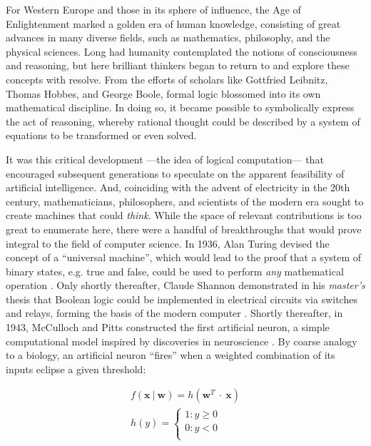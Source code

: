 For Western Europe and those in its sphere of influence, the Age of Enlightenment marked a golden era of human knowledge, consisting of great advances in many diverse fields, such as mathematics, philosophy, and the physical sciences.
Long had humanity contemplated the notions of consciousness and reasoning, but here brilliant thinkers began to return to and explore these concepts with resolve.
From the efforts of scholars like Gottfried Leibnitz, Thomas Hobbes, and George Boole, formal logic blossomed into its own mathematical discipline.
In doing so, it became possible to symbolically express the act of reasoning, whereby rational thought could be described by a system of equations to be transformed or even solved.

It was this critical development ---the idea of logical computation--- that encouraged subsequent generations to speculate on the apparent feasibility of artificial intelligence.
And, coinciding with the advent of electricity in the 20th century, mathematicians, philosophers, and scientists of the modern era sought to create machines that could \emph{think}.
While the space of relevant contributions is too great to enumerate here, there were a handful of breakthroughs that would prove integral to the field of computer science.
In 1936, Alan Turing devised the concept of a ``universal machine'', which would lead to the proof that a system of binary states, e.g. true and false, could be used to perform \emph{any} mathematical operation \cite{Turing1936Computable}.
Only shortly thereafter, Claude Shannon demonstrated in his \emph{master's} thesis that Boolean logic could be implemented in electrical circuits via switches and relays, forming the basis of the modern computer \cite{Shannon1938Symbolic}.
Shortly thereafter, in 1943, McCulloch and Pitts constructed the first artificial neuron, a simple computational model inspired by discoveries in neuroscience \cite{Mcculloch1943Logical}.
By coarse analogy to a biology, an artificial neuron ``fires'' when a weighted combination of its inputs eclipse a given threshold:

\begin{align*}
  f(\mathbf{x}~|~\mathbf{w}) = h(\mathbf{w}^T~\cdot~\mathbf{x})\\
  h(y) = \left\{
    \begin{array}{ll}
      1 : y \ge 0\\
      0 : y < 0\\
    \end{array}
  \right.
\label{eq:perceptron}
\end{align*}

